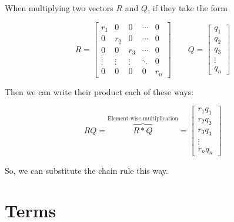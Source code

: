        \begin{concept}
            When multiplying two vectors $R$ and $Q$, if they take the form
            
            \begin{equation*}
                R = 
                \begin{bmatrix}
                    r_1     &0      &0      &\cdots & 0 \\
                    0       &r_2    &0      &\cdots & 0 \\
                    0       &0      &r_3    &\cdots & 0 \\
                    \vdots  &\vdots &\vdots &\ddots & 0 \\
                    0       &0      &0      &0      & r_n 
                \end{bmatrix}
                \qquad
                Q =
                \begin{bmatrix}
                    q_1 \\ q_2\\ q_3 \\ \vdots \\q_n
                \end{bmatrix}
            \end{equation*}
            
            Then we can write their product each of these ways:
            
            \begin{equation}
                RQ = 
                \overbrace{
                    R * Q
                }^{\text{Element-wise multiplication}}
                =
                \begin{bmatrix}
                    r_1q_1 \\ r_2q_2\\ r_3q_3 \\ \vdots \\r_nq_n
                \end{bmatrix}
            \end{equation}
        \end{concept}
        
        So, we can substitute the chain rule this way.

\section*{Terms}

